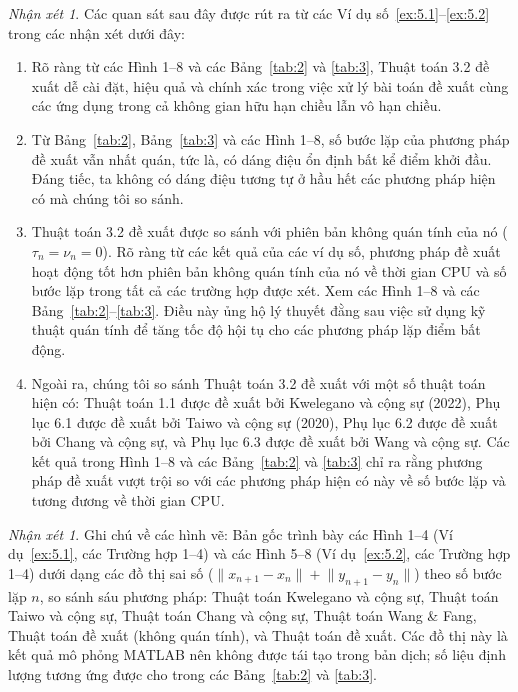 \documentclass[11pt,a4paper]{article}
\theoremstyle{plain}
\theoremstyle{definition}
\theoremstyle{remark}
\newtheorem{remark}[theorem]{Nhận xét}
\numberwithin{equation}{section}
\newcommand{\nm}[1]{\lVert #1\rVert}
\begin{document}
\begin{remark}\label{rem:5.3}
Các quan sát sau đây được rút ra từ các Ví dụ số~\ref{ex:5.1}--\ref{ex:5.2} trong các nhận xét dưới đây:
\begin{enumerate}[label=(\arabic*).]
\item Rõ ràng từ các Hình 1--8 và các Bảng~\ref{tab:2} và \ref{tab:3}, Thuật toán 3.2 đề xuất dễ cài đặt, hiệu quả và chính xác trong việc xử lý bài toán đề xuất cùng các ứng dụng trong cả không gian hữu hạn chiều lẫn vô hạn chiều.
\item Từ Bảng~\ref{tab:2}, Bảng~\ref{tab:3} và các Hình 1--8, số bước lặp của phương pháp đề xuất vẫn nhất quán, tức là, có dáng điệu ổn định bất kể điểm khởi đầu. Đáng tiếc, ta không có dáng điệu tương tự ở hầu hết các phương pháp hiện có mà chúng tôi so sánh.
\item Thuật toán 3.2 đề xuất được so sánh với phiên bản không quán tính của nó ($\tau_n=\nu_n=0$). Rõ ràng từ các kết quả của các ví dụ số, phương pháp đề xuất hoạt động tốt hơn phiên bản không quán tính của nó về thời gian CPU và số bước lặp trong tất cả các trường hợp được xét. Xem các Hình 1--8 và các Bảng~\ref{tab:2}--\ref{tab:3}. Điều này ủng hộ lý thuyết đằng sau việc sử dụng kỹ thuật quán tính để tăng tốc độ hội tụ cho các phương pháp lặp điểm bất động.
\item Ngoài ra, chúng tôi so sánh Thuật toán 3.2 đề xuất với một số thuật toán hiện có: Thuật toán 1.1 được đề xuất bởi Kwelegano và cộng sự (2022), Phụ lục 6.1 được đề xuất bởi Taiwo và cộng sự (2020), Phụ lục 6.2 được đề xuất bởi Chang và cộng sự, và Phụ lục 6.3 được đề xuất bởi Wang và cộng sự. Các kết quả trong Hình 1--8 và các Bảng~\ref{tab:2} và \ref{tab:3} chỉ ra rằng phương pháp đề xuất vượt trội so với các phương pháp hiện có này về số bước lặp và tương đương về thời gian CPU.
\end{enumerate}
\end{remark}

\begin{remark}
Ghi chú về các hình vẽ: Bản gốc trình bày các Hình 1--4 (Ví dụ~\ref{ex:5.1}, các Trường hợp 1--4) và các Hình 5--8 (Ví dụ~\ref{ex:5.2}, các Trường hợp 1--4) dưới dạng các đồ thị sai số ($\nm{x_{n+1}-x_n}+\nm{y_{n+1}-y_n}$) theo số bước lặp $n$, so sánh sáu phương pháp: Thuật toán Kwelegano và cộng sự, Thuật toán Taiwo và cộng sự, Thuật toán Chang và cộng sự, Thuật toán Wang \& Fang, Thuật toán đề xuất (không quán tính), và Thuật toán đề xuất. Các đồ thị này là kết quả mô phỏng MATLAB nên không được tái tạo trong bản dịch; số liệu định lượng tương ứng được cho trong các Bảng~\ref{tab:2} và \ref{tab:3}.
\end{remark}
\end{document}
